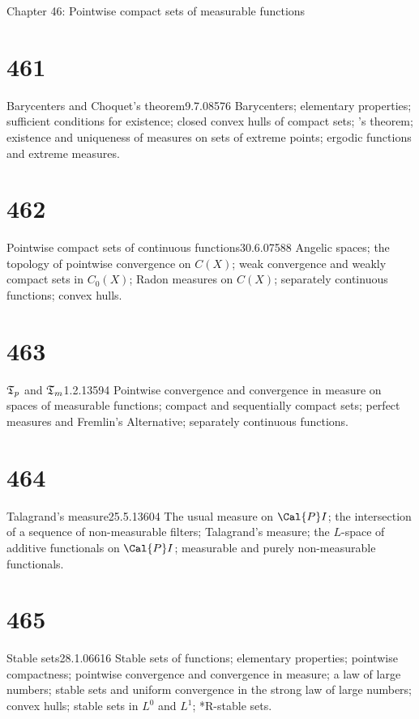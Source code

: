 Chapter 46: Pointwise compact sets of measurable functions


\section{461}{Barycenters and Choquet's theorem}{9.7.08}{576}{}
{Barycenters;  elementary properties;  sufficient conditions for
existence;  closed convex hulls of compact sets;  \Krein's theorem;
existence and uniqueness of measures on sets of extreme points;  ergodic
functions and extreme measures.}

\section{462}{Pointwise compact sets of continuous
functions}{30.6.07}{588}{}
{Angelic spaces;  the topology of pointwise convergence on $C(X)$;  weak
convergence and weakly compact sets in $C_0(X)$;  Radon measures on
$C(X)$;  separately continuous functions;  convex hulls.}

\section{463}{$\frak{T}_p$ and $\frak{T}_m$}{1.2.13}{594}{}
{Pointwise convergence and convergence in measure on spaces of
measurable functions;  compact and sequentially compact sets;  perfect
measures and Fremlin's Alternative;  separately continuous
functions.}

\section{464}{Talagrand's measure}{25.5.13}{604}{}
{The usual measure on
$\Cal{P}I$;  the intersection of a sequence of non-measurable filters;
Talagrand's measure;  the $L$-space of additive functionals on
$\Cal{P}I$;  measurable and purely non-measurable functionals.}

\ifdim\pagewidth>467pt\fontdimen3\tenrm=2pt\fi

\section{465}{Stable sets}{28.1.06}{616}{}
{Stable sets of functions;  elementary properties;  pointwise
compactness;  pointwise convergence and convergence in measure;   a law
of large numbers;  stable sets and uniform convergence in the strong law
of large numbers;  convex hulls;
stable sets in $L^0$ and $L^1$;  *R-stable sets.}
\tenrm=1.67pt

